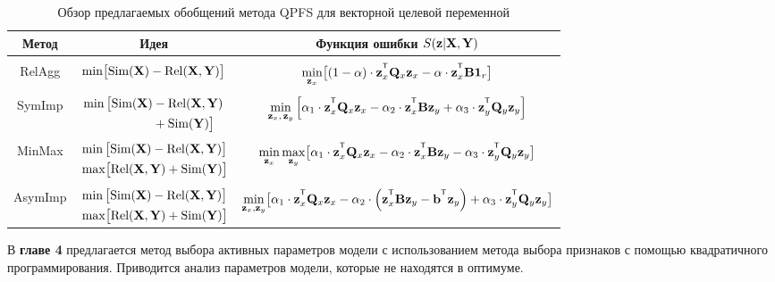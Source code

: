 \documentclass[11pt, a5paper]{dissert}
\begin{document}
\begin{table}[ht]
	\centering
	\caption{Обзор предлагаемых обобщений метода QPFS для векторной целевой переменной}
	\small{
		\begin{tabular}{c|c|c}
			\hline
			Метод & Идея & Функция ошибки $S(\mathbf{z} | \mathbf{X}, \mathbf{Y})$ \\
			\hline && \\ [-.5em]
			RelAgg & $\min \bigl[ \text{Sim}(\mathbf{X}) - \text{Rel}(\mathbf{X}, \mathbf{Y}) \bigr] $ & $\min\limits_{\bz_x} \bigl[ (1 - \alpha) \cdot \bz_x^{\T} \bQ_x \bz_x - \alpha \cdot \bz_x^{\T} \bB \bOne_r \bigr] $ \\ &&\\[-.5em]
			SymImp & $\begin{aligned} \min \, \bigl[ \text{Sim}(\mathbf{X}) & - \text{Rel}(\mathbf{X}, \mathbf{Y}) \\ & + \text{Sim}(\mathbf{Y}) \bigr] \end{aligned}$ & $ \min\limits_{\bz_x, \, \bz_y} \left[ \alpha_1 \cdot \bz_x^{\T} \bQ_x \bz_x - \alpha_2 \cdot \bz_x^{\T} \bB \bz_y + \alpha_3 \cdot \bz_y^{\T} \bQ_y \bz_y \right] $\\ &&\\ [-.5em]
			MinMax & $\begin{aligned} &\min \, \bigl[ \text{Sim}(\mathbf{X}) - \text{Rel}(\mathbf{X}, \mathbf{Y}) \bigr]  \\ & \max \bigl[\text{Rel}(\mathbf{X}, \mathbf{Y}) + \text{Sim}(\mathbf{Y}) \bigr] \end{aligned}$ & $	\min\limits_{\bz_x} 	\max\limits_{\bz_y} \bigl[\alpha_1 \cdot \bz_x^{\T} \bQ_x \bz_x - \alpha_2 \cdot \bz_x^{\T} \bB \bz_y - \alpha_3 \cdot \bz_y^{\T} \bQ_y \bz_y \bigr]$ \\ &&\\ [-.5em]
			AsymImp & $\begin{aligned} & \min \, \bigl[ \text{Sim}(\mathbf{X}) - \text{Rel}(\mathbf{X}, \mathbf{Y}) \bigr]\\ &  \max \bigl[\text{Rel}(\mathbf{X}, \mathbf{Y}) + \text{Sim}(\mathbf{Y}) \bigr] \end{aligned}$ & $\min\limits_{\bz_x, \bz_y} \bigl[ \alpha_1 \cdot \bz_x^{\T} \bQ_x \bz_x - \alpha_2 \cdot \left(\bz_x^{\T} \bB \bz_y - \bb^{\T} \bz_y \right) + \alpha_3 \cdot \bz_y^{\T} \bQ_y \bz_y \bigr]$\\ 
			\hline
	\end{tabular}}
	\label{ch3:tbl:summary}
\end{table}

В \textbf{главе 4} предлагается метод выбора активных параметров модели с использованием метода выбора признаков с помощью квадратичного программирования. 
Приводится анализ параметров модели, которые не находятся в оптимуме.
\end{document}
